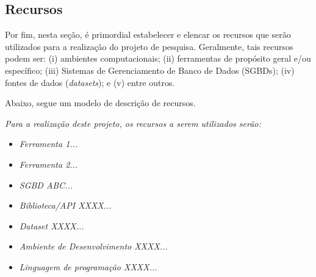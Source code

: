\subsection{Recursos}\label{sec:recursos}

Por fim, nesta seção, é primordial estabelecer e elencar os recursos que serão utilizados para a realização do projeto de pesquisa. Geralmente, tais recursos podem ser: (i) ambientes computacionais; (ii) ferramentas de propósito geral e/ou específico; (iii) Sistemas de Gerenciamento de Banco de Dados (SGBDs); (iv) fontes de dados (\textit{datasets}); e (v) entre outros.

Abaixo, segue um modelo de descrição de recursos.

\textit{Para a realização deste projeto, os recursos a serem utilizados serão:}

\begin{itemize}[nosep, leftmargin=2.5cm]
    \item \textit{Ferramenta 1...}
    \item \textit{Ferramenta 2...}
    \item \textit{SGBD ABC...}
    \item \textit{Biblioteca/API XXXX...}
    \item \textit{Dataset XXXX...}
    \item \textit{Ambiente de Desenvolvimento XXXX...}
    \item \textit{Linguagem de programação XXXX...}
\end{itemize}